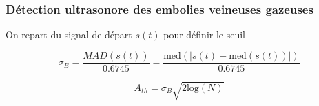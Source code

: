 \documentclass{beamer}
\begin{document}
\begin{frame}
\frametitle{Détection ultrasonore des embolies veineuses gazeuses}
On repart du signal de départ $s(t)$ pour définir le seuil\\
\vspace{0.2cm}
\begin{center}
\end{center}

\[ \sigma_B = \frac{MAD(s(t))}{0.6745} = \frac{ \text{med}(|s(t) - \text{med}(s(t))|)}{0.6745} \]

\[ A_{th} =  \sigma_B \sqrt{2\text{log}(N)} \]
\end{frame}
\end{document}
